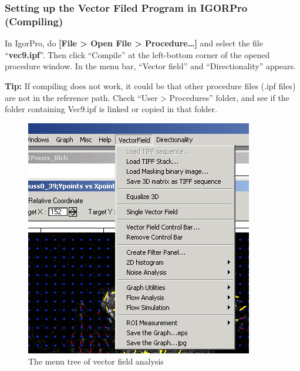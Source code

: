 \documentclass{article}
\begin{document}
\subsubsection{Setting up the Vector Filed Program in IGORPro
(Compiling)}\label{setting-up-the-vector-filed-program-in-igorpro-compiling}

In IgorPro, do \textbf{{[}File \textgreater{} Open File \textgreater{}
Procedure\ldots{}{]}} and select the file ``\textbf{vec9.ipf}''. Then
click ``Compile'' at the left-bottom corner of the opened procedure
window. In the menu bar, ``Vector field'' and ``Directionality''
appears.

\textbf{Tip:} If compiling does not work, it could be that other procedure
files (.ipf files) are not in the reference path. Check ``User
\textgreater{} Procedures'' folder, and see if the folder containing
Vec9.ipf is linked or copied in that folder.


\begin{figure}[!ht]
\begin{center}
\includegraphics[scale=0.6]{img/VecFieldMenu.jpg}
\caption{ The menu tree of vector field analysis}
\label{fig:vecfieldMenu}
\end{center}
\end{figure}
\end{document}
